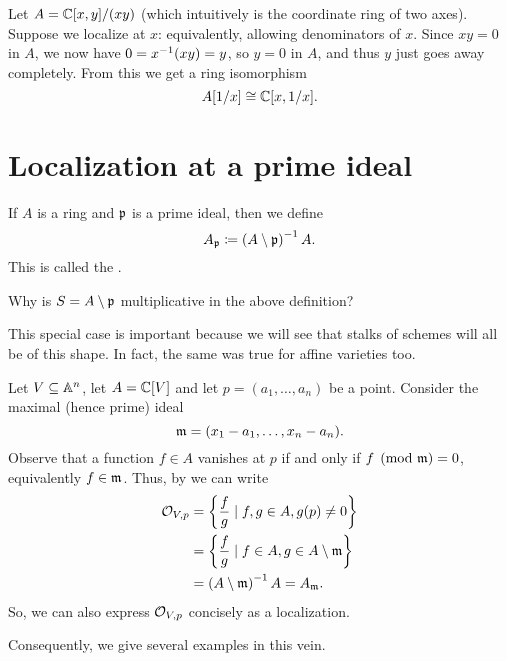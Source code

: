 
\begin{example}
	Let $A = \mathbb C[x,y] / (xy)$
	(which intuitively is the coordinate ring of two axes).
	Suppose we localize at $x$:
	equivalently, allowing denominators of $x$.
	Since $xy = 0$ in $A$, we now have $0 = x^{-1} (xy) = y$,
	so $y = 0$ in $A$, and thus $y$ just goes away completely.
	From this we get a ring isomorphism
	\[ A[1/x] \cong \mathbb C[x,1/x].\]
\end{example}

\section{Localization at a prime ideal}
\label{sec:localize_prime_ideal}

\begin{definition}
	If $A$ is a ring and $\mathfrak p$ is a prime ideal, then we define
	\[ A_\mathfrak p \coloneqq \left( A \setminus \mathfrak p \right)^{-1} A. \]
	This is called the .
\end{definition}
\begin{ques}
	Why is $S = A \setminus \mathfrak p$ multiplicative
	in the above definition?
\end{ques}


This special case is important because we will see that
stalks of schemes will all be of this shape.
In fact, the same was true for affine varieties too.
\begin{example}
	Let $V \subseteq \mathbb A^n$, let $A = \mathbb C[V]$
	and let $p = (a_1, \dots, a_n)$ be a point.
	Consider the maximal (hence prime) ideal
	\[ \mathfrak m = (x_1 - a_1, \dots, x_n - a_n). \]
	Observe that a function $f \in A$ vanishes at $p$
	if and only if $f \pmod{\mathfrak m} = 0$, equivalently $f \in \mathfrak m$.
	Thus, by  we can write
	\begin{align*}
		\mathcal O_{V,p} &= \left\{ \frac{f}{g} \mid f,g \in A, g(p) \neq 0 \right\} \\
		&= \left\{ \frac{f}{g} \mid f \in A, g \in A \setminus \mathfrak m \right\} \\
		&= \left( A \setminus \mathfrak m \right)^{-1} A = A_\mathfrak m.
	\end{align*}
	So, we can also express $\mathcal O_{V,p}$ concisely as a localization.
\end{example}
Consequently, we give several examples in this vein.

